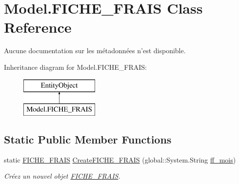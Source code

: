 \hypertarget{class_model_1_1_f_i_c_h_e___f_r_a_i_s}{\section{Model.\-F\-I\-C\-H\-E\-\_\-\-F\-R\-A\-I\-S Class Reference}
\label{class_model_1_1_f_i_c_h_e___f_r_a_i_s}
}


Aucune documentation sur les métadonnées n'est disponible.  


Inheritance diagram for Model.\-F\-I\-C\-H\-E\-\_\-\-F\-R\-A\-I\-S\-:\begin{figure}[H]
\begin{center}
\leavevmode
\includegraphics[height=2.000000cm]{class_model_1_1_f_i_c_h_e___f_r_a_i_s}
\end{center}
\end{figure}
\subsection*{Static Public Member Functions}
\begin{DoxyCompactItemize}
\item 
static \hyperlink{class_model_1_1_f_i_c_h_e___f_r_a_i_s}{F\-I\-C\-H\-E\-\_\-\-F\-R\-A\-I\-S} \hyperlink{class_model_1_1_f_i_c_h_e___f_r_a_i_s_a6498fb4372397a7caf9cdb0cf7f04985}{Create\-F\-I\-C\-H\-E\-\_\-\-F\-R\-A\-I\-S} (global\-::\-System.\-String \hyperlink{class_model_1_1_f_i_c_h_e___f_r_a_i_s_a5eb7f69b224a609736362ff9827a478c}{ff\-\_\-mois})
\begin{DoxyCompactList}\small\item\em Créez un nouvel objet \hyperlink{class_model_1_1_f_i_c_h_e___f_r_a_i_s}{F\-I\-C\-H\-E\-\_\-\-F\-R\-A\-I\-S}. \end{DoxyCompactList}\end{DoxyCompactItemize}
